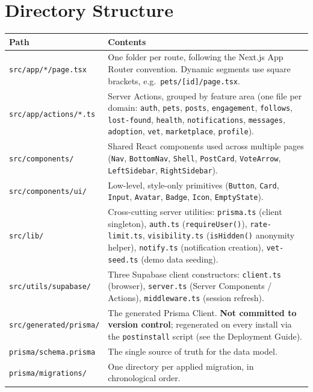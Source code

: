 \documentclass[11pt,a4paper]{article}
\begin{document}
\section{Directory Structure}
\begin{longtable}{@{}p{4.5cm}p{9.5cm}@{}}
\toprule
\textbf{Path} & \textbf{Contents} \\
\midrule
\endhead
\texttt{src/app/*/page.tsx} & One folder per route, following the Next.js App Router
  convention. Dynamic segments use square brackets, e.g.\ \texttt{pets/[id]/page.tsx}. \\
\texttt{src/app/actions/*.ts} & Server Actions, grouped by feature area (one file per
  domain: \texttt{auth}, \texttt{pets}, \texttt{posts}, \texttt{engagement},
  \texttt{follows}, \texttt{lost-found}, \texttt{health}, \texttt{notifications},
  \texttt{messages}, \texttt{adoption}, \texttt{vet}, \texttt{marketplace},
  \texttt{profile}). \\
\texttt{src/components/} & Shared React components used across multiple pages
  (\texttt{Nav}, \texttt{BottomNav}, \texttt{Shell}, \texttt{PostCard},
  \texttt{VoteArrow}, \texttt{LeftSidebar}, \texttt{RightSidebar}). \\
\texttt{src/components/ui/} & Low-level, style-only primitives
  (\texttt{Button}, \texttt{Card}, \texttt{Input}, \texttt{Avatar}, \texttt{Badge},
  \texttt{Icon}, \texttt{EmptyState}). \\
\texttt{src/lib/} & Cross-cutting server utilities: \texttt{prisma.ts} (client
  singleton), \texttt{auth.ts} (\texttt{requireUser()}), \texttt{rate-limit.ts},
  \texttt{visibility.ts} (\texttt{isHidden()} anonymity helper), \texttt{notify.ts}
  (notification creation), \texttt{vet-seed.ts} (demo data seeding). \\
\texttt{src/utils/supabase/} & Three Supabase client constructors: \texttt{client.ts}
  (browser), \texttt{server.ts} (Server Components / Actions), \texttt{middleware.ts}
  (session refresh). \\
\texttt{src/generated/prisma/} & The generated Prisma Client. \textbf{Not committed to
  version control}; regenerated on every install via the \texttt{postinstall} script
  (see the Deployment Guide). \\
\texttt{prisma/schema.prisma} & The single source of truth for the data model. \\
\texttt{prisma/migrations/} & One directory per applied migration, in chronological
  order. \\
\bottomrule
\end{longtable}
\end{document}
